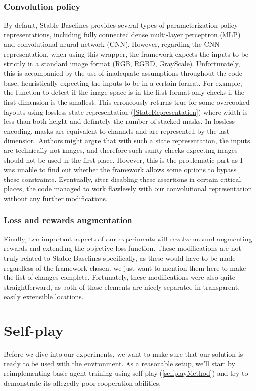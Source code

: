 \subsubsection*{Convolution policy}
By default, Stable Baselines provides several types of parameterization policy representations, including fully connected dense multi-layer perceptron (MLP) and convolutional neural network (CNN).
However, regarding the CNN representation, when using this wrapper, the framework expects the inputs to be strictly in a standard image format (RGB, RGBD, GrayScale).
Unfortunately, this is accompanied by the use of inadequate assumptions throughout the code base, heuristically expecting the inputs to be in a certain format.
For example, the function to detect if the image space is in the first format only checks if the first dimension is the smallest.
This erroneously returns true for some overcooked layouts using lossless state representation (\ref{StateRepresentation}) where width is less than both height and definitely the number of stacked masks.
In lossless encoding, masks are equivalent to channels and are represented by the last dimension.
Authors might argue that with such a state representation, the inputs are technically not images, and therefore such sanity checks expecting images should not be used in the first place.
However, this is the problematic part as I was unable to find out whether the framework allows some options to bypass these constraints.
Eventually, after disabling these assertions in certain critical places, the code managed to work flawlessly with our convolutional representation without any further modifications.

\subsubsection*{Loss and rewards augmentation}
Finally, two important aspects of our experiments will revolve around augmenting rewards and extending the objective loss function.
These modifications are not truly related to Stable Baselines specifically, as these would have to be made regardless of the framework chosen, we just want to mention them here to make the list of changes complete. 
Fortunately, these modifications were also quite straightforward, as both of these elements are nicely separated in transparent, easily extensible locations.

\section{Self-play}
Before we dive into our experiments, we want to make sure that our solution is ready to be used with the environment.
As a reasonable setup, we'll start by reimplementing basic agent training using self-play (\ref{selfplayMethod}) and try to demonstrate its allegedly poor cooperation abilities.


